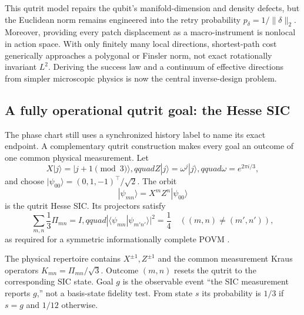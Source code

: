 \documentclass[11pt]{article}
\begin{document}
This qutrit model repairs the qubit's manifold-dimension and density defects,
but the Euclidean norm remains engineered into the retry probability
$p_\delta=1/\|\delta\|_2$. Moreover, providing every patch displacement as a
macro-instrument is nonlocal in action space. With only finitely many local
directions, shortest-path cost generically approaches a polygonal or Finsler
norm, not exact rotationally invariant $L^2$. Deriving the success law and a
continuum of effective directions from simpler microscopic physics is now the
central inverse-design problem.

\subsection{A fully operational qutrit goal: the Hesse SIC}

The phase chart still uses a synchronized history label to name its exact
endpoint. A complementary qutrit construction makes every goal an outcome of
one common physical measurement. Let
\begin{equation}
 X|j\rangle=|j+1\!\!\pmod3\rangle,qquad
 Z|j\rangle=\omega^j|j\rangle,qquad \omega=e^{2\pi i/3},
\end{equation}
and choose $|\psi_{00}\rangle=(0,1,-1)^\top/\sqrt2$. The orbit
\begin{equation}
 |\psi_{mn}\rangle=X^mZ^n|\psi_{00}\rangle
 \label{eq:hesse-orbit}
\end{equation}
is the qutrit Hesse SIC. Its projectors satisfy
\begin{equation}
 \sum_{m,n}\frac13\Pi_{mn}=I,qquad
 |\langle\psi_{mn}|\psi_{m'n'}\rangle|^2=\frac14
 \quad((m,n)\ne(m',n')), \label{eq:hesse-sic}
\end{equation}
as required for a symmetric informationally complete POVM
\cite{renes2004,scott2006}.

The physical repertoire contains $X^{\pm1},Z^{\pm1}$ and the common
measurement Kraus operators $K_{mn}=\Pi_{mn}/\sqrt3$. Outcome $(m,n)$ resets
the qutrit to the corresponding SIC state. Goal $g$ is the observable event
``the SIC measurement reports $g$,'' not a basis-state fidelity test. From
state $s$ its probability is $1/3$ if $s=g$ and $1/12$ otherwise.
\end{document}
